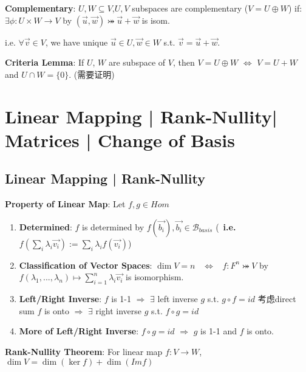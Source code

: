 \documentclass[9pt]{article}
\begin{document}
\textbf{Complementary}: $U,W\subseteq V$,$U,V$ subspaces are complementary ($V=U\oplus W$) if: \quad $\exists\phi:U\times W\to V$ by $(\vec{u},\vec{w})\bij\vec{u}+\vec{w}$ is isom.

\quad \quad \quad \quad \quad \quad \quad \quad i.e. $\forall\vec{v}\in V$, we have unique $\vec{u}\in U,\vec{w}\in W$ s.t. $\vec{v}=\vec{u}+\vec{w}$. 

\textbf{Criteria Lemma}: If $U$, $W$ are subspace of $V$, then $V=U\oplus W$ $\Leftrightarrow$ $V=U+W$ and $U\cap W=\{0\}$. {\scriptsize (需要证明)}


\section{Linear Mapping | Rank-Nullity| Matrices | Change of Basis }

\subsection{Linear Mapping | Rank-Nullity} %

\textbf{Property of Linear Map}: Let $f,g\in Hom$

\begin{enumerate}[itemsep=-2pt, topsep=-2pt]
    \item \textbf{Determined}: $f$ is determined by $f(\vec{b_i}),\vec{b_i}\in \mathcal{B}_{basis}$ {\footnotesize (\star \ \textbf{i.e.} $f(\sum_{i}\lambda_i\vec{v_i}):=\sum_{i}\lambda_if(\vec{v_i})$)}
    \item \textbf{Classification of Vector Spaces}: $\dim V=n$ \ $\Leftrightarrow$ \ $f:F^n\bij V$ by $f(\lambda_1,...,\lambda_n)\mapsto\sum_{i=1}^{n}\lambda_i\vec{v_i}$ is isomorphism.
    \item \textbf{Left/Right Inverse}: $f$ is 1-1 $\Rightarrow$ $\exists$ left inverse $g$ s.t. $g\circ f=id$ {\scriptsize 考虑direct sum} \quad \quad $f$ is onto $\Rightarrow$ $\exists$ right inverse $g$ s.t. $f\circ g=id$
    \item \np\textbf{More of Left/Right Inverse}: $f\circ g=id$ $\Rightarrow$ $g$ is 1-1 and $f$ is onto. 
\end{enumerate}

\textbf{Rank-Nullity Theorem}: For linear map $f:V\to W$, $\dim V=\dim(\ker f)+\dim(Im f)$ \quad \quad {}
\end{document}
